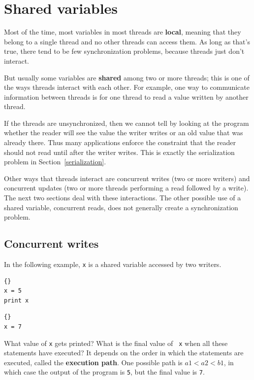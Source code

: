 \documentclass{book}
\begin{document}
\section {Shared variables}
\label{shared}

Most of the time, most variables in most threads are {\bf local},
meaning that they belong to a single thread and no other threads
can access them.  As long as that's true, there tend to be few
synchronization problems, because threads just don't interact.

But usually some variables are {\bf shared} among two or more
threads; this is one of the ways threads interact with each other.
For example, one way to communicate information between threads is
for one thread to read a value written by another thread.

If the threads are unsynchronized, then we cannot tell by looking at
the program whether the reader will see the value the writer writes
or an old value that was already there.
Thus many applications enforce the constraint that the reader
should not read until after the writer writes.  This is exactly
the serialization problem in Section~\ref{serialization}.

Other ways that threads interact are
concurrent writes (two or more writers) and concurrent updates
(two or more threads performing a read followed by a write).
The next two sections deal with these interactions.  The other
possible use of a shared variable, concurrent
reads, does not generally create a synchronization problem.


\subsection {Concurrent writes}

In the following example, {\tt x} is a shared variable accessed
by two writers.

\begin{minipage}[t]{0.4\textwidth}
    \begin{lstlisting}[title={Thread A}]{}
x = 5
print x
\end{lstlisting}
\end{minipage}
\hfill
\begin{minipage}[t]{0.4\textwidth}
    \begin{lstlisting}[title={Thread B}]{}
x = 7
\end{lstlisting}
\end{minipage}

What value of {\tt x} gets printed?  What is the final value of {\tt
        x} when all these statements have executed?  It depends on the order
in which the statements are executed, called the {\bf execution path}.
One possible path is $a1 < a2 < b1$, in which case the output of the
program is {\tt 5}, but the final value is {\tt 7}.
\end{document}
